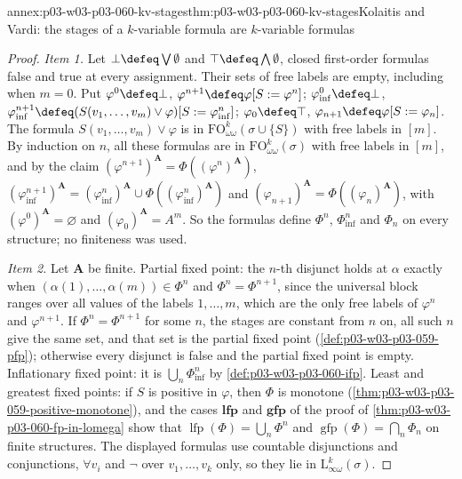 \begin{annexitem}{annex:p03-w03-p03-060-kv-stages}{thm:p03-w03-p03-060-kv-stages}{Kolaitis and Vardi: the stages of a \(k\)-variable formula are \(k\)-variable formulas}
\begin{proof}
\emph{Item 1.} Let \(\bot\defeq\bigvee\emptyset\) and
\(\top\defeq\bigwedge\emptyset\), closed first-order formulas false and
true at every assignment. Their sets of free labels are empty, including
when \(m=0\). Put \(\varphi^0\defeq\bot\),
\(\varphi^{n+1}\defeq\varphi[S:=\varphi^n]\);
\(\varphi^0_{\mathrm{inf}}\defeq\bot\),
\(\varphi^{n+1}_{\mathrm{inf}}\defeq(S(v_1,\ldots,v_m)\vee\varphi)[S:=\varphi^n_{\mathrm{inf}}]\);
\(\varphi_0\defeq\top\), \(\varphi_{n+1}\defeq\varphi[S:=\varphi_n]\). The
formula \(S(v_1,\ldots,v_m)\vee\varphi\) is in
\(\mathrm{FO}^k_{\omega\omega}(\sigma\cup\{S\})\) with free labels in
\([m]\). By induction on \(n\), all these formulas are in
\(\mathrm{FO}^k_{\omega\omega}(\sigma)\) with free labels in \([m]\), and by
the claim \((\varphi^{n+1})^{\mathbf A}=\Phi((\varphi^n)^{\mathbf A})\),
\((\varphi^{n+1}_{\mathrm{inf}})^{\mathbf A}=(\varphi^n_{\mathrm{inf}})^{\mathbf A}\cup\Phi((\varphi^n_{\mathrm{inf}})^{\mathbf A})\)
and \((\varphi_{n+1})^{\mathbf A}=\Phi((\varphi_n)^{\mathbf A})\), with
\((\varphi^0)^{\mathbf A}=\varnothing\) and
\((\varphi_0)^{\mathbf A}=A^m\). So the formulas define \(\Phi^n\),
\(\Phi^n_{\mathrm{inf}}\) and \(\Phi_n\) on every structure; no finiteness
was used.

\emph{Item 2.} Let \(\mathbf A\) be finite. Partial fixed point: the
\(n\)-th disjunct holds at \(\alpha\) exactly when
\((\alpha(1),\ldots,\alpha(m))\in\Phi^n\) and \(\Phi^n=\Phi^{n+1}\), since
the universal block ranges over all values of the labels \(1,\ldots,m\),
which are the only free labels of \(\varphi^n\) and \(\varphi^{n+1}\). If
\(\Phi^n=\Phi^{n+1}\) for some \(n\), the stages are constant from \(n\) on,
all such \(n\) give the same set, and that set is the partial fixed point
(\cref{def:p03-w03-p03-059-pfp}); otherwise every disjunct is false and the
partial fixed point is empty. Inflationary fixed point: it is
\(\bigcup_n\Phi^n_{\mathrm{inf}}\) by \cref{def:p03-w03-p03-060-ifp}.
Least and greatest fixed points: if \(S\) is positive in \(\varphi\), then
\(\Phi\) is monotone (\cref{thm:p03-w03-p03-059-positive-monotone}), and the
cases \(\mathbf{lfp}\) and \(\mathbf{gfp}\) of the proof of
\cref{thm:p03-w03-p03-060-fp-in-lomega} show that
\(\operatorname{lfp}(\Phi)=\bigcup_n\Phi^n\) and
\(\operatorname{gfp}(\Phi)=\bigcap_n\Phi_n\) on finite structures. The
displayed formulas use countable disjunctions and conjunctions,
\(\forall v_i\) and \(\neg\) over \(v_1,\ldots,v_k\) only, so they lie in
\(\mathrm{L}^k_{\infty\omega}(\sigma)\).
\end{proof}
\end{annexitem}

